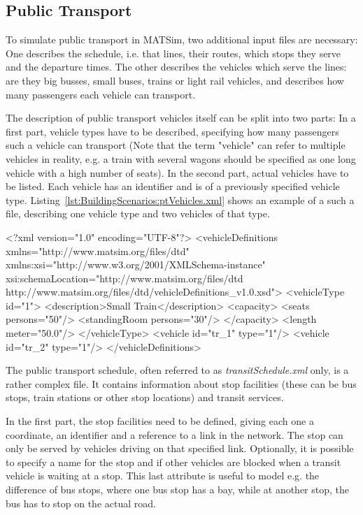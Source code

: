 
\subsection{Public Transport}

To simulate public transport in MATSim, two additional input files are
necessary: One describes the schedule, i.e. that lines, their routes, which
stops they serve and the departure times. The other describes the vehicles which
serve the lines: are they big busses, small buses, trains or light rail
vehicles, and describes how many passengers each vehicle can transport.

The description of public transport vehicles itself can be split into two parts:
In a first part, vehicle types have to be described, specifying how many
passengers such a vehicle can transport (Note that the term "vehicle" can refer
to multiple vehicles in reality, e.g. a train with several wagons should be specified as
one long vehicle with a high number of seats). In the second part, actual
vehicles have to be listed. Each vehicle has an identifier and is of a previously
specified vehicle type. Listing~\ref{lst:BuildingScenarios:ptVehicles.xml} shows
an example of a such a file, describing one vehicle type and two vehicles of
that type.

\begin{xml-file}[caption=An example of transitVehicles.xml,
label=lst:BuildingScenarios:ptVehicles.xml]
<?xml version="1.0" encoding="UTF-8"?>
<vehicleDefinitions xmlns="http://www.matsim.org/files/dtd"
       xmlns:xsi="http://www.w3.org/2001/XMLSchema-instance"
       xsi:schemaLocation="http://www.matsim.org/files/dtd 
                     http://www.matsim.org/files/dtd/vehicleDefinitions_v1.0.xsd">
<vehicleType id="1">
		<description>Small Train</description>
		<capacity>
			<seats persons="50"/>
			<standingRoom persons="30"/>
		</capacity>
		<length meter="50.0"/>
	</vehicleType>
	<vehicle id="tr_1" type="1"/>
	<vehicle id="tr_2" type="1"/>
</vehicleDefinitions>
\end{xml-file}

The public transport schedule, often referred to as \emph{transitSchedule.xml}
only, is a rather complex file. It contains information about stop facilities
(these can be bus stops, train stations or other stop locations) and transit
services.

In the first part, the stop facilities need to be defined, giving each one a
coordinate, an identifier and a reference to a link in the network. The stop can
only be served by vehicles driving on that specified link. Optionally, it is
possible to specify a name for the stop and if other vehicles are blocked
when a transit vehicle is waiting at a stop. This last attribute is useful to
model e.g. the difference of bus stops, where one bus stop has a bay, while at
another stop, the bus has to stop on the actual road.

